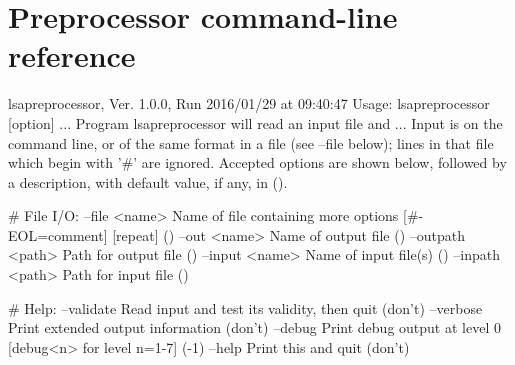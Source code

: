 \chapter{Preprocessor command-line reference}

\begin{Snippet}
lsapreprocessor, Ver. 1.0.0, Run 2016/01/29 at 09:40:47
Usage: lsapreprocessor [option] ...
 Program lsapreprocessor will read an input file and ...
 Input is on the command line, or of the same format in a file (see --file below);
 lines in that file which begin with '#' are ignored. Accepted options are 
 shown below, followed by a description, with default value, if any, in ().

# File I/O:
 --file <name>    Name of file containing more options [#-EOL=comment] [repeat] ()
 --out <name>     Name of output file ()
 --outpath <path> Path for output file ()
 --input <name>   Name of input file(s) ()
 --inpath <path>  Path for input file ()

# Help:
 --validate       Read input and test its validity, then quit (don't)
 --verbose        Print extended output information (don't)
 --debug          Print debug output at level 0 [debug<n> for level n=1-7] (-1)
 --help           Print this and quit (don't)
\end{Snippet}
